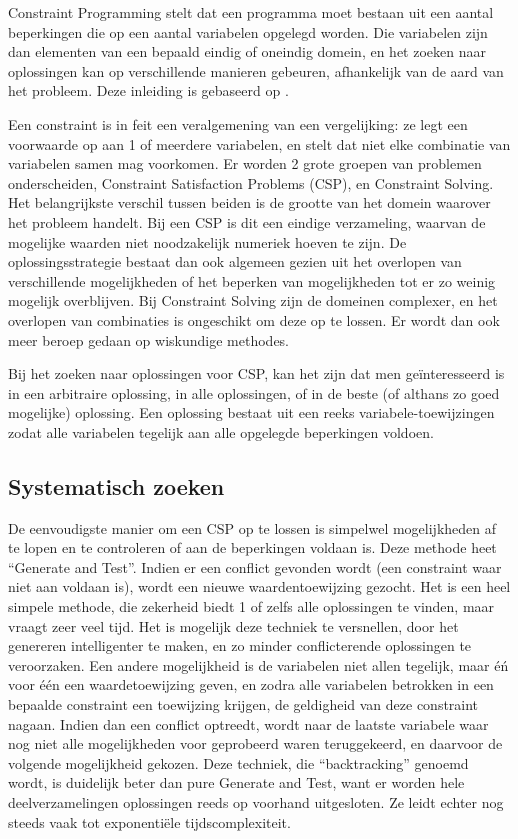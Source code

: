 Constraint Programming stelt dat een programma moet bestaan uit een aantal beperkingen die op een aantal variabelen opgelegd worden. Die variabelen zijn dan elementen van een bepaald eindig of oneindig domein, en het zoeken naar oplossingen kan op verschillende manieren gebeuren, afhankelijk van de aard van het probleem. Deze inleiding is gebaseerd op \cite{bartak99constraint}.

Een constraint is in feit een veralgemening van een vergelijking: ze legt een voorwaarde op aan 1 of meerdere variabelen, en stelt dat niet elke combinatie van variabelen samen mag voorkomen. Er worden 2 grote groepen van problemen onderscheiden, Constraint Satisfaction Problems (CSP), en Constraint Solving. Het belangrijkste verschil tussen beiden is de grootte van het domein waarover het probleem handelt. Bij een CSP is dit een eindige verzameling, waarvan de mogelijke waarden niet noodzakelijk numeriek hoeven te zijn. De oplossingsstrategie bestaat dan ook algemeen gezien uit het overlopen van verschillende mogelijkheden of het beperken van mogelijkheden tot er zo weinig mogelijk overblijven. Bij Constraint Solving zijn de domeinen complexer, en het overlopen van combinaties is ongeschikt om deze op te lossen. Er wordt dan ook meer beroep gedaan op wiskundige methodes.

Bij het zoeken naar oplossingen voor CSP, kan het zijn dat men ge\"interesseerd is in een arbitraire oplossing, in alle oplossingen, of in de beste (of althans zo goed mogelijke) oplossing. Een oplossing bestaat uit een reeks variabele-toewijzingen zodat alle variabelen tegelijk aan alle opgelegde beperkingen voldoen.

\subsection{Systematisch zoeken}

De eenvoudigste manier om een CSP op te lossen is simpelwel mogelijkheden af te lopen en te controleren of aan de beperkingen voldaan is. Deze methode heet ``Generate and Test''. Indien er een conflict gevonden wordt (een constraint waar niet aan voldaan is), wordt een nieuwe waardentoewijzing gezocht.
Het is een heel simpele methode, die zekerheid biedt 1 of zelfs alle oplossingen te vinden, maar vraagt zeer veel tijd. Het is mogelijk deze techniek te versnellen, door het genereren intelligenter te maken, en zo minder conflicterende oplossingen te veroorzaken. Een andere mogelijkheid is de variabelen niet allen tegelijk, maar \'e\'n voor \'e\'en een waardetoewijzing geven, en zodra alle variabelen betrokken in een bepaalde constraint een toewijzing krijgen, de geldigheid van deze constraint nagaan. Indien dan een conflict optreedt, wordt naar de laatste variabele waar nog niet alle mogelijkheden voor geprobeerd waren teruggekeerd, en daarvoor de volgende mogelijkheid gekozen. Deze techniek, die ``backtracking'' genoemd wordt, is duidelijk beter dan pure Generate and Test, want er worden hele deelverzamelingen oplossingen reeds op voorhand uitgesloten. Ze leidt echter nog steeds vaak tot exponenti\"ele tijdscomplexiteit.

